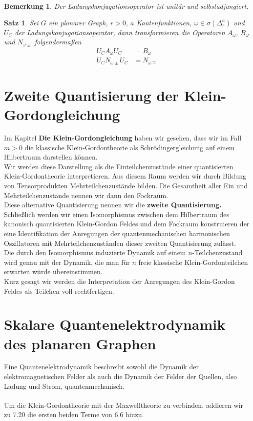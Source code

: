 \documentclass[11pt,a4paper,leqno]{report}
\newtheorem{proposition}{Satz}[chapter]
\newtheorem{remark}[theorem]{Bemerkung}
\numberwithin{equation}{chapter}
\begin{document}
\begin{remark}
	Der Ladungskonjugationsoperator ist unit\"ar und selbstadjungiert.
\end{remark}
\begin{proposition}
	Sei $G$ ein planarer Graph, $r>0$, $a$ Kantenfunktionen, $\omega\in\sigma(\Delta_r^a)$ und $U_C$ der Ladungskonjugationsoperator, dann transformieren die Operatoren $A_\omega$, $B_\omega$ und $N_{\omega\pm}$ folgenderma\ss{}en
	\begin{align}
	U_CA_\omega U_C &= B_\omega\\
	U_C N_{\omega \pm} U_C &= N_{\omega \mp}
\end{align}
\end{proposition}
\chapter{Zweite Quantisierung der Klein-Gordongleichung}
Im Kapitel \textbf{Die Klein-Gordongleichung} haben wir gesehen, dass wir im Fall $m>0$ die klassische Klein-Gordontheorie als Schr\"odingergleichung auf einem Hilbertraum darstellen k\"onnen.\\
Wir werden diese Darstellung als die Einteilchenzust\"ande einer quantisierten Klein-Gordontheorie interpretieren.
Aus diesem Raum werden wir durch Bildung von Tensorprodukten Mehrteilchenzust\"ande bilden. Die Gesamtheit aller Ein und Mehrteilchenzust\"ande nennen wir dann den Fockraum.\\
Diese alternative Quantisierung nennen wir die \textbf{zweite Quantisierung.}\\
 Schlie\ss{}lich werden wir einen Isomorphismus zwischen dem Hilbertraum des kanonisch quantisierten Klein-Gordon Feldes und dem Fockraum konstruieren der eine Identifikation der Anregungen der quantenmechanischen harmonischen Oszillatoren mit Mehrteilchenzust\"anden dieser zweiten Quantisierung zul\"asst.\\
 Die durch den Isomorphismus induzierte Dynamik auf einem $n$-Teilchenzustand wird genau mit der Dynamik, die man f\"ur $n$ freie klassische Klein-Gordonteilchen erwarten w\"urde \"ubereinstimmen.\\
 Kurz gesagt wir werden die Interpretation der Anregungen des Klein-Gordon Feldes als Teilchen voll rechtfertigen.
\chapter{Skalare Quantenelektrodynamik des planaren Graphen}
Eine Quantenelektrodynamik beschreibt sowohl die Dynamik der elektromagnetischen Felder als auch die Dynamik der Felder der Quellen, also Ladung und Strom, quantenmechanisch.\\
\\ 
Um die Klein-Gordontheorie mit der Maxwelltheorie zu verbinden, addieren wir zu 7.20 die ersten beiden Terme von 6.6 hinzu.
\end{document}
